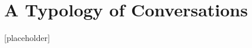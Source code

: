 \documentclass{article}
\begin{document}
\section{A Typology of Conversations}
[placeholder]

\newpage
\printbibliography
\end{document}
